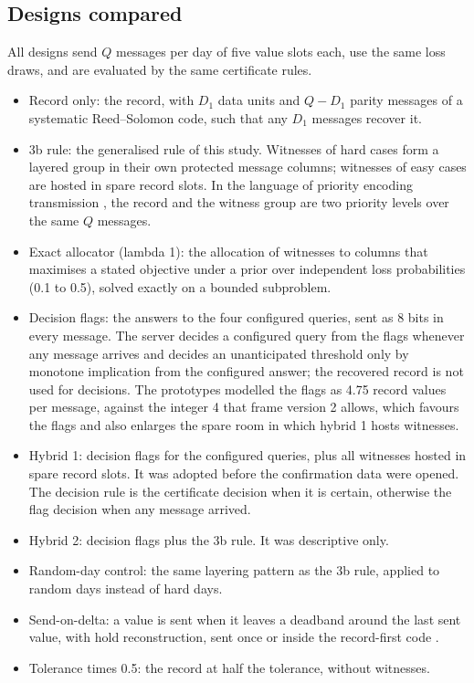 \subsection{Designs compared}
\label{sec:designs}
All designs send $Q$ messages per day of five value slots each, use the same loss draws, and are evaluated by the same certificate rules.
\begin{itemize}
  \item Record only: the record, with $D_1$ data units and $Q - D_1$ parity messages of a systematic Reed--Solomon code, such that any $D_1$ messages recover it.
  \item 3b rule: the generalised rule of this study. Witnesses of hard cases form a layered group in their own protected message columns; witnesses of easy cases are hosted in spare record slots. In the language of priority encoding transmission \citep{albanese1996}, the record and the witness group are two priority levels over the same $Q$ messages.
  \item Exact allocator (lambda 1): the allocation of witnesses to columns that maximises a stated objective under a prior over independent loss probabilities (0.1 to 0.5), solved exactly on a bounded subproblem.
  \item Decision flags: the answers to the four configured queries, sent as 8 bits in every message. The server decides a configured query from the flags whenever any message arrives and decides an unanticipated threshold only by monotone implication from the configured answer; the recovered record is not used for decisions. The prototypes modelled the flags as 4.75 record values per message, against the integer 4 that frame version 2 allows, which favours the flags and also enlarges the spare room in which hybrid 1 hosts witnesses.
  \item Hybrid 1: decision flags for the configured queries, plus all witnesses hosted in spare record slots. It was adopted before the confirmation data were opened. The decision rule is the certificate decision when it is certain, otherwise the flag decision when any message arrived.
  \item Hybrid 2: decision flags plus the 3b rule. It was descriptive only.
  \item Random-day control: the same layering pattern as the 3b rule, applied to random days instead of hard days.
  \item Send-on-delta: a value is sent when it leaves a deadband around the last sent value, with hold reconstruction, sent once or inside the record-first code \citep{diazcacho2017sod}.
  \item Tolerance times 0.5: the record at half the tolerance, without witnesses.
\end{itemize}
